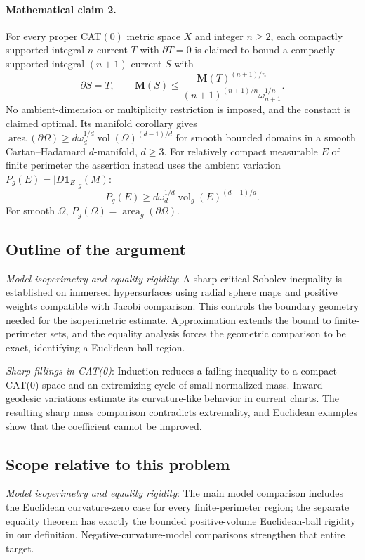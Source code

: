 \documentclass[11pt]{article}
\begin{document}
\paragraph{Mathematical claim 2.} For every proper CAT$(0)$ metric space $X$ and integer $n\ge2$, each compactly supported integral $n$-current $T$ with $\partial T=0$ is claimed to bound a compactly supported integral $(n+1)$-current $S$ with \[\partial S=T,\qquad\mathbf M(S)\le\frac{\mathbf M(T)^{(n+1)/n}}{(n+1)^{(n+1)/n}\omega_{n+1}^{1/n}}.\] No ambient-dimension or multiplicity restriction is imposed, and the constant is claimed optimal. Its manifold corollary gives $\operatorname{area}(\partial\Omega)\ge d\omega_d^{1/d}\operatorname{vol}(\Omega)^{(d-1)/d}$ for smooth bounded domains in a smooth Cartan--Hadamard $d$-manifold, $d\ge3$. For relatively compact measurable $E$ of finite perimeter the assertion instead uses the ambient variation $P_g(E)=|D\mathbf1_E|_g(M)$: \[P_g(E)\ge d\omega_d^{1/d}\operatorname{vol}_g(E)^{(d-1)/d}.\] For smooth $\Omega$, $P_g(\Omega)=\operatorname{area}_g(\partial\Omega)$.

\subsection{Outline of the argument}
\textit{Model isoperimetry and equality rigidity}: A sharp critical Sobolev inequality is established on immersed hypersurfaces using radial sphere maps and positive weights compatible with Jacobi comparison. This controls the boundary geometry needed for the isoperimetric estimate. Approximation extends the bound to finite-perimeter sets, and the equality analysis forces the geometric comparison to be exact, identifying a Euclidean ball region.

\textit{Sharp fillings in CAT(0)}: Induction reduces a failing inequality to a compact CAT(0) space and an extremizing cycle of small normalized mass. Inward geodesic variations estimate its curvature-like behavior in current charts. The resulting sharp mass comparison contradicts extremality, and Euclidean examples show that the coefficient cannot be improved.

\subsection{Scope relative to this problem}
\textit{Model isoperimetry and equality rigidity}: The main model comparison includes the Euclidean curvature-zero case for every finite-perimeter region; the separate equality theorem has exactly the bounded positive-volume Euclidean-ball rigidity in our definition. Negative-curvature-model comparisons strengthen that entire target.
\end{document}
